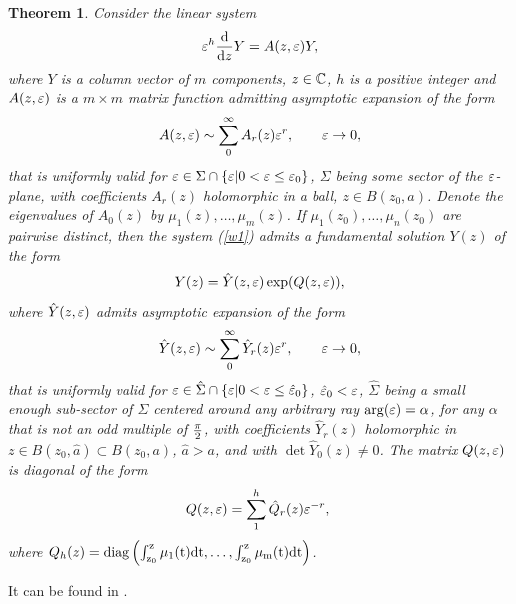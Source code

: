 \documentclass{amsart}
\newtheorem{theorem}{Theorem}[section]
\theoremstyle{definition}
\theoremstyle{remark}
\theoremstyle{remark}
\begin{document}
\begin{theorem} Consider the linear system
\begin{equation}
\varepsilon^h {{\rm d}\over{\rm d} z} Y = A(z,\varepsilon) Y,
\label{w1}\end{equation}
where $Y$ is a column vector of $m$ components, $z\in{\mathbb C}$, $h$
is a positive integer and $A(z,\varepsilon)$ is a $m\times m$ matrix function
admitting asymptotic expansion of the form
\begin{equation}
A(z,\varepsilon)\sim \sum_0^\infty A_r(z)\varepsilon^r,\qquad \varepsilon\to 0,
\label{w2}\end{equation}
that is uniformly valid for
$\varepsilon\in\Sigma\cap\{\varepsilon|0<\varepsilon\leq\varepsilon_0\}$,
$\Sigma$ being some sector of the $\varepsilon$-plane, with coefficients
$A_r(z)$ holomorphic in a ball, $z\in B(z_0,a)$. Denote the eigenvalues
of $A_0(z)$ by $\mu_1(z),\dots,\mu_m(z)$.
If $\mu_1(z_0),\dots,\mu_n(z_0)$ are pairwise distinct, then the system
(\ref{w1}) admits a fundamental solution $Y(z)$ of the form
\begin{equation}
Y(z)=\hat Y(z,\varepsilon) \exp(Q(z,\varepsilon)),
\label{w3}\end{equation}
where $\hat Y(z,\varepsilon)$ admits asymptotic expansion of the form
\begin{equation}
\hat Y(z,\varepsilon)\sim \sum_0^\infty\hat Y_r(z)\varepsilon^r,\qquad \varepsilon\to 0,
\label{w4}\end{equation}
that is uniformly valid for
$\varepsilon\in\hat\Sigma\cap\{\varepsilon|0<\varepsilon\leq\hat{\varepsilon}_0\}$, $\hat{\varepsilon}_0<\varepsilon$,
$\hat\Sigma$ being a
small enough sub-sector of $\Sigma$ centered around any arbitrary ray
${\rm arg}(\varepsilon)=\alpha$, for any $\alpha$ that is not an odd multiple of
${\pi\over2}$, with coefficients $\hat Y_r(z)$ holomorphic
in $z\in B(z_0,\hat a)\subset B(z_0,a)$, $\hat a>a$, and with
$\det\hat Y_0(z)\neq 0$. The matrix $Q(z,\varepsilon)$ is diagonal of the form
\begin{equation}
Q(z,\varepsilon)=\sum_1^h\hat Q_r(z)\varepsilon^{-r},\
\label{w5}\end{equation}
where $Q_h(z)=\rm{diag}\left(\int_{z_0}^z\mu_1(t)\rm{d}t,\dots,
\int_{z_0}^z\mu_m(t)\rm{d}t\right)$.
\label{Was}\end{theorem}

\proof It can be found in \cite{Was,Sib}.
\end{document}
